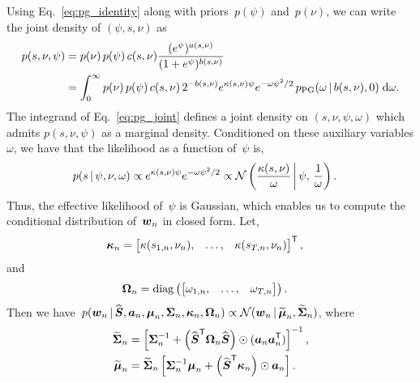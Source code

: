 Using Eq.~\ref{eq:pg_identity} along with priors~$p(\psi)$ and~$p(\nu)$, we can write the joint density of $(\psi, s, \nu)$ as
\begin{align}
  \label{eq:pg_joint}
  p(s, \nu, \psi)
  &= p(\nu) \, p(\psi) \, c(s, \nu) \frac{(e^\psi)^{a(s, \nu)}}{(1+e^\psi)^{b(s, \nu)}} \\
  &= \int_0^\infty
  p(\nu) \, p(\psi) \, c(s, \nu) \, 2^{-b(s, \nu)} e^{\kappa(s, \nu) \psi} e^{-\omega \psi^2/2} \, p_{\mathrm{PG}}(\omega \,|\, b(s, \nu), 0) \; \mathrm{d}\omega.
\end{align}
The integrand of Eq.~\ref{eq:pg_joint} defines a joint density on $(s, \nu, \psi, \omega)$ which admits $p(s, \nu, \psi)$ as a marginal density.
Conditioned on these auxiliary variables $\omega$, we have that the likelihood as a function of~$\psi$ is,
\begin{align}
  p(s \,|\, \psi, \nu, \omega)
  &\propto e^{\kappa(s, \nu) \psi} e^{- \omega \psi^2/2} 
\propto \mathcal{N} \left(\frac{\kappa(s, \nu)}{\omega} \, \bigg| \, \psi, \, \frac{1}{\omega} \right).
\end{align}
Thus, the effective likelihood of~$\psi$ is Gaussian, which enables
us to compute the conditional distribution of~$\boldsymbol{w}_n$ in closed form.
Let,
\begin{align}
  \boldsymbol{\kappa}_n
  &= \begin{bmatrix} \kappa(s_{1,n}, \nu_n), &\ldots, &\kappa(s_{T,n}, \nu_n)
  \end{bmatrix}^{\mathsf{T}},
\end{align}
and
\begin{align}
  \boldsymbol{\Omega}_n &= \mathrm{diag} \left(
  \begin{bmatrix}
    \omega_{1,n}, & \ldots, & \omega_{T,n}
  \end{bmatrix}
  \right).
\end{align}
Then we have~$
  p(\boldsymbol{w}_n \,|\, \widehat{\boldsymbol{S}}, \boldsymbol{a}_n, \boldsymbol{\mu}_n, \boldsymbol{\Sigma}_n, \boldsymbol{\kappa}_n, \boldsymbol{\Omega}_n)
  \propto \mathcal{N}(\boldsymbol{w}_n \,|\, \widetilde{\boldsymbol{\mu}}_n, \widetilde{\boldsymbol{\Sigma}}_n)$,
where
\begin{align}
  \widetilde{\boldsymbol{\Sigma}}_n &= \left[ \boldsymbol{\Sigma}_n^{-1} +
  \left(\widehat{\boldsymbol{S}}^{\mathsf{T}} \boldsymbol{\Omega}_n \widehat{\boldsymbol{S}} \right) \odot (\boldsymbol{a}_n \boldsymbol{a}_n^{\mathsf{T}}) \right]^{-1}, \\
  \widetilde{\boldsymbol{\mu}}_n &= \widetilde{\boldsymbol{\Sigma}}_n \left[ \boldsymbol{\Sigma}_n^{-1} \boldsymbol{\mu}_n +
  \left(\widehat{\boldsymbol{S}}^{\mathsf{T}} \boldsymbol{\kappa}_n \right) \odot \boldsymbol{a}_n \right].
\end{align}



